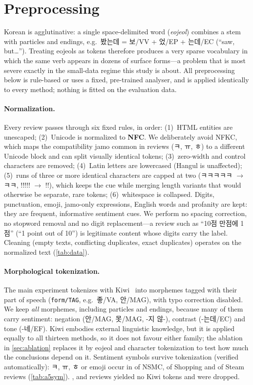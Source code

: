 \section{Preprocessing}
\label{sec:preprocessing}

Korean is agglutinative: a single space-delimited word (\emph{eojeol}) combines a
stem with particles and endings, e.g.\ 봤는데 = 보/VV + 었/EP + 는데/EC (``saw,
but\ldots''). Treating eojeols as tokens therefore produces a very sparse vocabulary in
which the same verb appears in dozens of surface forms---a problem that is most severe
exactly in the small-data regime this study is about. All preprocessing below is
rule-based or uses a fixed, pre-trained analyser, and is applied identically to every
method; nothing is fitted on the evaluation data.

\paragraph{Normalization.}
Every review passes through six fixed rules, in order:
(1)~HTML entities are unescaped;
(2)~Unicode is normalized to \textbf{NFC}. We deliberately avoid NFKC, which maps the
compatibility jamo common in reviews (ㅋ, ㅠ, ㅎ) to a different Unicode block and can
split visually identical tokens;
(3)~zero-width and control characters are removed;
(4)~Latin letters are lowercased (Hangul is unaffected);
(5)~runs of three or more identical characters are capped at two
(ㅋㅋㅋㅋㅋ $\to$ ㅋㅋ, !!!!! $\to$ !!), which keeps the cue while merging length
variants that would otherwise be separate, rare tokens;
(6)~whitespace is collapsed. Digits, punctuation, emoji, jamo-only expressions,
English words and profanity are kept: they are frequent, informative sentiment cues.
We perform no spacing correction, no stopword removal and no digit replacement---a
review such as ``10점 만점에 1점'' (``1 point out of 10'') is legitimate content whose
digits carry the label. Cleaning (empty texts, conflicting duplicates, exact
duplicates) operates on the normalized text (\cref{tab:data}).

\paragraph{Morphological tokenization.}
The main experiment tokenizes with Kiwi~\cite{kiwipiepy} into morphemes tagged with
their part of speech (\texttt{form/TAG}, e.g.\ 좋/VA, 안/MAG), with typo correction
disabled. We keep \emph{all} morphemes, including particles and endings, because many
of them carry sentiment: negation (안/MAG, 못/MAG, -지 않-), contrast (-는데/EC) and
tone (-네/EF). Kiwi embodies external linguistic knowledge, but it is applied equally to
all thirteen methods, so it does not favour either family; the ablation in
\cref{sec:ablation} replaces it by eojeol and character tokenization to test how much
the conclusions depend on it. Sentiment symbols survive tokenization (verified
automatically): ㅋ, ㅠ, ㅎ or emoji occur in \symbolShareNSMC{} of NSMC,
\symbolShareShopping{} of Shopping and \symbolShareSteam{} of Steam reviews
(\cref{tab:a5sym}). \nKiwiEmptyNSMC, \nKiwiEmptyShopping{} and \nKiwiEmptySteam{}
reviews yielded no Kiwi tokens and were dropped.

